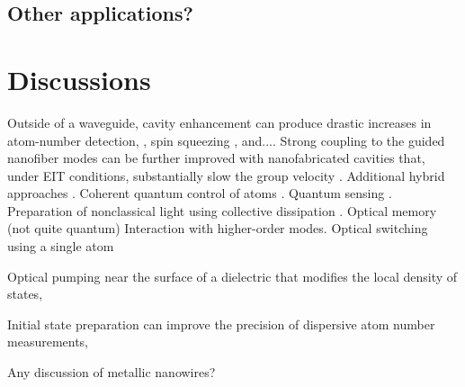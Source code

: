 \documentclass[preprint,aps,pra,onecolumn]{revtex4-1} %
\newcommand{\comment}[1]{{\color{Maroon} #1}}
\begin{document}


\subsection{Other applications?} 


\section{Discussions}

Outside of a waveguide, cavity enhancement can produce drastic increases in atom-number detection, \cite{zhang_collective_2012}, spin squeezing \cite{bohnet_reduced_2014}, and....   Strong coupling to the guided nanofiber modes can be further improved with nanofabricated cavities that, under EIT conditions, substantially slow the group velocity \cite{le_kien_intracavity_2009,wuttke_nanofiber_2012,nayak_optical_2014}.  Additional hybrid approaches \cite{hafezi_atomic_2012, yalla_cavity_2014}.  Coherent quantum control of atoms \cite{smith_quantum_2013-1}.  Quantum sensing \cite{kumar_autler-townes_2015}.  Preparation of nonclassical light using collective dissipation \cite{gonzalez-tudela_deterministic_2015}.  Optical memory (not quite quantum) \cite{sayrin_storage_2015, gouraud_demonstration_2015} Interaction with higher-order modes.  Optical switching using a single atom \cite{oshea_fiber-optical_2013} 

Optical pumping near the surface of a dielectric that modifies the local density of states, 

Initial state preparation can improve the precision of dispersive atom number measurements, 

\cite{scheel_directional_2015}
\comment{Any discussion of metallic nanowires?}




%
%


%	
%	
\end{document}
